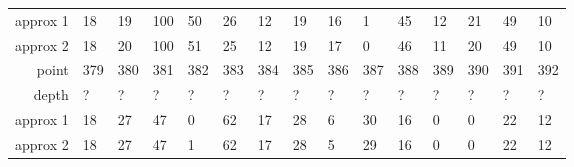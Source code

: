 \begin{center}
\begin{supertabular}{|r|l l l l l l l l l l l l l l|}
approx 1 & 18 & 19 & 100 & 50 & 26 & 12 & 19 & 16 & 1 & 45 & 12 & 21 & 49 & 10 \\
approx 2 & 18 & 20 & 100 & 51 & 25 & 12 & 19 & 17 & 0 & 46 & 11 & 20 & 49 & 10 \\
\hline
point & 379 & 380 & 381 & 382 & 383 & 384 & 385 & 386 & 387 & 388 & 389 & 390 & 391 & 392 \\
\hline
depth & ? & ? & ? & ? & ? & ? & ? & ? & ? & ? & ? & ? & ? & ? \\
approx 1 & 18 & 27 & 47 & 0 & 62 & 17 & 28 & 6 & 30 & 16 & 0 & 0 & 22 & 12 \\
approx 2 & 18 & 27 & 47 & 1 & 62 & 17 & 28 & 5 & 29 & 16 & 0 & 0 & 22 & 12 \\
  \end{supertabular}
  \label{tab:test.auto4d}
\end{center}

